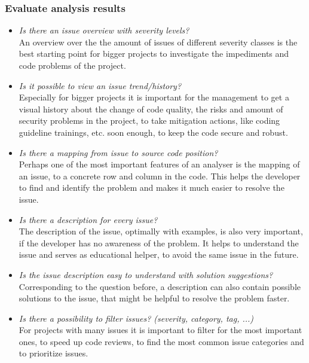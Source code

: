 \documentclass[conference]{IEEEtran}
\begin{document}
\subsubsection{Evaluate analysis results}
\label{subsubsec:evaluation_results}
\begin{itemize}
	\item \textit{Is there an issue overview with severity levels?} \\
	An overview over the the amount of issues of different severity classes is the best starting point for bigger projects to investigate the impediments and code problems of the project.
	
	\item \textit{Is it possible to view an issue trend/history?} \\
	Especially for bigger projects it is important for the management to get a visual history about the change of code quality, the risks and amount of security problems in the project, to take mitigation actions, like coding guideline trainings, etc. soon enough, to keep the code secure and robust.	
	
	\item \textit{Is there a mapping from issue to source code position?} \\
	Perhaps one of the most important features of an analyser is the mapping of an issue, to a concrete row and column in the code.
	This helps the developer to find and identify the problem and makes it much easier to resolve the issue.
	
	\item \textit{Is there a description for every issue?} \\
	The description of the issue, optimally with examples, is also very important, if the developer has no awareness of the problem.
	It helps to understand the issue and serves as educational helper, to avoid the same issue in the future.
	
	\item \textit{Is the issue description easy to understand with solution suggestions?} \\
	Corresponding to the question before, a description can also contain possible solutions to the issue, that might be helpful to resolve the problem faster.
	
	\item \textit{Is there a possibility to filter issues? (severity, category, tag, ...)} \\
	For projects with many issues it is important to filter for the most important ones, to speed up code reviews, to find the most common issue categories and to prioritize issues.
\end{itemize}
\end{document}
